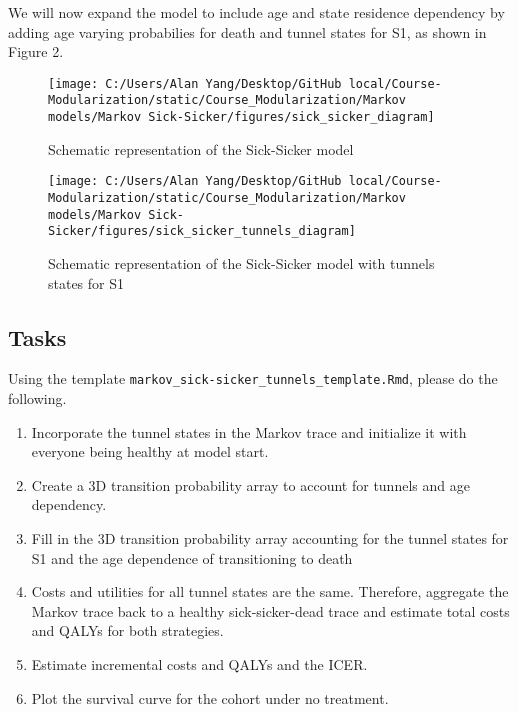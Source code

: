 \documentclass[
]{article}
\begin{document}
We will now expand the model to include age and state residence
dependency by adding age varying probabilies for death and tunnel states
for S1, as shown in Figure 2.

\begin{figure}

{\centering \texttt{[image: C:/Users/Alan Yang/Desktop/GitHub local/Course-Modularization/static/Course\_Modularization/Markov models/Markov Sick-Sicker/figures/sick\_sicker\_diagram]} 

}

\caption{Schematic representation of the Sick-Sicker model}\label{fig:unnamed-chunk-1}
\end{figure}

\begin{figure}

{\centering \texttt{[image: C:/Users/Alan Yang/Desktop/GitHub local/Course-Modularization/static/Course\_Modularization/Markov models/Markov Sick-Sicker/figures/sick\_sicker\_tunnels\_diagram]} 

}

\caption{Schematic representation of the Sick-Sicker model with tunnels states for S1}\label{fig:unnamed-chunk-2}
\end{figure}

\hypertarget{tasks}{%
\subsection{Tasks}\label{tasks}}

Using the template \texttt{markov\_sick-sicker\_tunnels\_template.Rmd},
please do the following.

\begin{enumerate}
\def\labelenumi{\arabic{enumi}.}
\item
  Incorporate the tunnel states in the Markov trace and initialize it
  with everyone being healthy at model start.
\item
  Create a 3D transition probability array to account for tunnels and
  age dependency.
\item
  Fill in the 3D transition probability array accounting for the tunnel
  states for S1 and the age dependence of transitioning to death
\item
  Costs and utilities for all tunnel states are the same. Therefore,
  aggregate the Markov trace back to a healthy sick-sicker-dead trace
  and estimate total costs and QALYs for both strategies.
\item
  Estimate incremental costs and QALYs and the ICER.
\item
  Plot the survival curve for the cohort under no treatment.
\end{enumerate}
\end{document}
